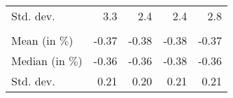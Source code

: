 \begin{tabular}{lllll}
\multicolumn{1}{l}{\hspace{2em}Std. dev.} &
  \multicolumn{1}{|r}{3.3} &
  \multicolumn{1}{r}{2.4} &
  \multicolumn{1}{r}{2.4} &
  \multicolumn{1}{r}{2.8} \\
\multicolumn{1}{l}{\hspace{1em}{\textit{Elasticity} ($\widehat{\beta}$)}} &
  \multicolumn{1}{|r}{} &
  \multicolumn{1}{r}{} &
  \multicolumn{1}{r}{} &
  \multicolumn{1}{r}{} \\
\multicolumn{1}{l}{\hspace{2em}Mean (in $\%$)} &
  \multicolumn{1}{|r}{-0.37} &
  \multicolumn{1}{r}{-0.38} &
  \multicolumn{1}{r}{-0.38} &
  \multicolumn{1}{r}{-0.37} \\
\multicolumn{1}{l}{\hspace{2em}Median (in $\%$)} &
  \multicolumn{1}{|r}{-0.36} &
  \multicolumn{1}{r}{-0.36} &
  \multicolumn{1}{r}{-0.38} &
  \multicolumn{1}{r}{-0.36} \\
\multicolumn{1}{l}{\hspace{2em}Std. dev.} &
  \multicolumn{1}{|r}{0.21} &
  \multicolumn{1}{r}{0.20} &
  \multicolumn{1}{r}{0.21} &
  \multicolumn{1}{r}{0.21} \\
\cline{1-5}
\end{tabular}
